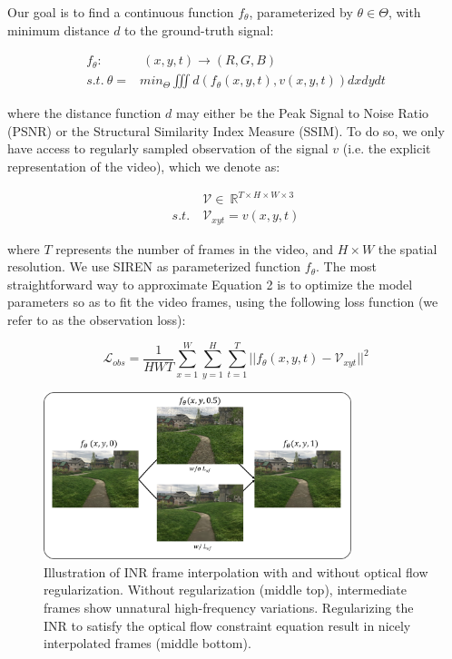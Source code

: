 \documentclass{article}
\begin{document}
Our goal is to find a continuous function $f_{\theta}$, parameterized by $\theta \in \Theta$,
with minimum distance $d$ to the ground-truth signal:

\begin{equation}
\begin{aligned}
f_{\theta}:& \:(x, y, t) \rightarrow (R, G, B) \\
s.t. \: \theta =& min_{\Theta} \iiint d(f_{\theta}(x,y,t), v(x,y,t)) dx dy dt
\end{aligned}
\end{equation}

where the distance function $d$ may either be the Peak Signal to Noise Ratio (PSNR) or the Structural Similarity Index Measure (SSIM).
To do so, we only have access to regularly sampled observation of the signal $v$
(i.e. the explicit representation of the video), which we denote as:

\begin{equation}
\begin{aligned}
&\mathcal{V} \in  \: \mathbb{R}^{T \times H \times W \times 3} \\
s.t. \: &\mathcal{V}_{xyt} =   v(x, y, t) %
\end{aligned}
\end{equation}

where $T$ represents the number of frames in the video, and $H \times W$ the spatial resolution.
We use SIREN as parameterized function $f_{\theta}$.
The most straightforward way to approximate Equation 2 is to optimize the model parameters so as to fit the video frames,
using the following loss function (we refer to as the observation loss):

\begin{equation}
\mathcal{L}_{obs} = \frac{1}{HWT} \sum_{x=1}^W\sum_{y=1}^H\sum_{t=1}^T || f_{\theta}(x,y,t) - \mathcal{V}_{xyt} ||^2
\end{equation}

\begin{figure}[t]
\centering
\includegraphics[width=0.8\textwidth]{"w_wo_OF"}
\caption{Illustration of INR frame interpolation with and without optical flow regularization.
Without regularization (middle top), intermediate frames show unnatural high-frequency variations.
Regularizing the INR to satisfy the optical flow constraint equation result in nicely interpolated frames (middle bottom).
}
\label{fig_w_wo_OF}
\end{figure}
\end{document}
